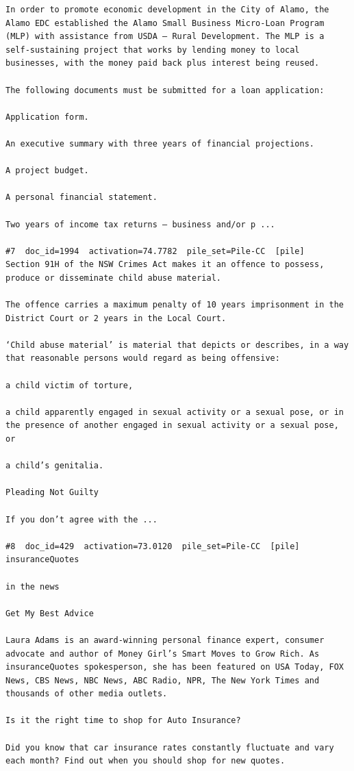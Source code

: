 \begin{verbatim}
In order to promote economic development in the City of Alamo, the Alamo EDC established the Alamo Small Business Micro-Loan Program (MLP) with assistance from USDA – Rural Development. The MLP is a self-sustaining project that works by lending money to local businesses, with the money paid back plus interest being reused.

The following documents must be submitted for a loan application:

Application form.

An executive summary with three years of financial projections.

A project budget.

A personal financial statement.

Two years of income tax returns – business and/or p ...

#7  doc_id=1994  activation=74.7782  pile_set=Pile-CC  [pile]
Section 91H of the NSW Crimes Act makes it an offence to possess, produce or disseminate child abuse material.

The offence carries a maximum penalty of 10 years imprisonment in the District Court or 2 years in the Local Court.

‘Child abuse material’ is material that depicts or describes, in a way that reasonable persons would regard as being offensive:

a child victim of torture,

a child apparently engaged in sexual activity or a sexual pose, or in the presence of another engaged in sexual activity or a sexual pose, or

a child’s genitalia.

Pleading Not Guilty

If you don’t agree with the ...

#8  doc_id=429  activation=73.0120  pile_set=Pile-CC  [pile]
insuranceQuotes

in the news

Get My Best Advice

Laura Adams is an award-winning personal finance expert, consumer advocate and author of Money Girl’s Smart Moves to Grow Rich. As insuranceQuotes spokesperson, she has been featured on USA Today, FOX News, CBS News, NBC News, ABC Radio, NPR, The New York Times and thousands of other media outlets.

Is it the right time to shop for Auto Insurance?

Did you know that car insurance rates constantly fluctuate and vary each month? Find out when you should shop for new quotes.


\end{verbatim}
